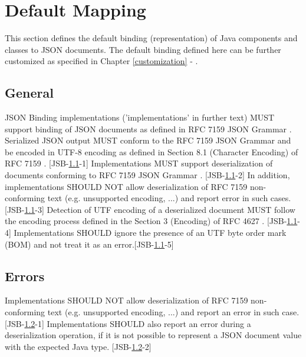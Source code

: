 \chapter{Default Mapping}
\label{defaultmapping}

This section defines the default binding (representation) of Java components and classes to JSON documents. The default binding defined here can be further customized as specified in Chapter \ref{customization} - .

\section{General}
\label{sec:general}
JSON Binding implementations ('implementations' in further text) MUST support binding of JSON documents as defined in RFC 7159 JSON Grammar \cite{rfc7159}. Serialized JSON output MUST conform to the RFC 7159 JSON Grammar \cite{rfc7159} and be encoded in UTF-8 encoding as defined in Section 8.1 (Character Encoding) of RFC 7159 \cite{rfc7159}. [JSB-\ref{sec:general}-1] 
Implementations MUST support deserialization of documents conforming to RFC 7159 JSON Grammar \cite{rfc7159}. [JSB-\ref{sec:general}-2] In addition, implementations SHOULD NOT allow deserialization of RFC 7159 \cite{rfc7159} non-conforming text (e.g. unsupported encoding, ...) and report error in such cases. [JSB-\ref{sec:general}-3] 
Detection of UTF encoding of a deserialized document MUST follow the encoding process defined in the Section 3 (Encoding) of RFC 4627 \cite{rfc4627}. [JSB-\ref{sec:general}-4] 
Implementations SHOULD ignore the presence of an UTF byte order mark (BOM) and not treat it as an error.[JSB-\ref{sec:general}-5]

\section{Errors}
\label{sec:errors}
Implementations SHOULD NOT allow deserialization of RFC 7159 \cite{rfc7159} non-conforming text (e.g. unsupported encoding, ...) and report an error in such case. [JSB-\ref{sec:errors}-1] 
Implementations SHOULD also report an error during a deserialization operation, if it is not possible to represent a JSON document value with the expected Java type. [JSB-\ref{sec:errors}-2]

